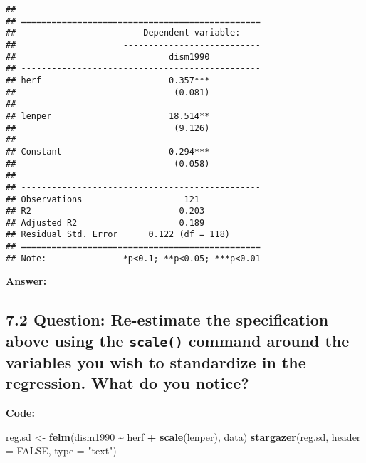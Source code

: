 \documentclass[
]{article}
\newenvironment{Shaded}{\begin{snugshade}}{\end{snugshade}}
\newcommand{\AttributeTok}[1]{\textcolor[rgb]{0.13,0.29,0.53}{#1}}
\newcommand{\ConstantTok}[1]{\textcolor[rgb]{0.56,0.35,0.01}{#1}}
\newcommand{\FunctionTok}[1]{\textcolor[rgb]{0.13,0.29,0.53}{\textbf{#1}}}
\newcommand{\NormalTok}[1]{#1}
\newcommand{\OtherTok}[1]{\textcolor[rgb]{0.56,0.35,0.01}{#1}}
\newcommand{\SpecialCharTok}[1]{\textcolor[rgb]{0.81,0.36,0.00}{\textbf{#1}}}
\newcommand{\StringTok}[1]{\textcolor[rgb]{0.31,0.60,0.02}{#1}}
\begin{document}
\begin{verbatim}
## 
## ===============================================
##                         Dependent variable:    
##                     ---------------------------
##                              dism1990          
## -----------------------------------------------
## herf                         0.357***          
##                               (0.081)          
##                                                
## lenper                       18.514**          
##                               (9.126)          
##                                                
## Constant                     0.294***          
##                               (0.058)          
##                                                
## -----------------------------------------------
## Observations                    121            
## R2                             0.203           
## Adjusted R2                    0.189           
## Residual Std. Error      0.122 (df = 118)      
## ===============================================
## Note:               *p<0.1; **p<0.05; ***p<0.01
\end{verbatim}

\textbf{Answer:}

\clearpage

\hypertarget{question-re-estimate-the-specification-above-using-the-scale-command-around-the-variables-you-wish-to-standardize-in-the-regression.-what-do-you-notice}{%
\subsection{\texorpdfstring{7.2 Question: Re-estimate the specification
above using the \texttt{scale()} command around the variables you wish
to standardize in the regression. What do you
notice?}{7.2 Question: Re-estimate the specification above using the scale() command around the variables you wish to standardize in the regression. What do you notice?}}\label{question-re-estimate-the-specification-above-using-the-scale-command-around-the-variables-you-wish-to-standardize-in-the-regression.-what-do-you-notice}}

\textbf{Code:}

\begin{Shaded}
\begin{Highlighting}[]
\NormalTok{reg.sd }\OtherTok{\textless{}{-}} \FunctionTok{felm}\NormalTok{(dism1990 }\SpecialCharTok{\textasciitilde{}}\NormalTok{ herf }\SpecialCharTok{+} \FunctionTok{scale}\NormalTok{(lenper), data)}
\FunctionTok{stargazer}\NormalTok{(reg.sd, }\AttributeTok{header =} \ConstantTok{FALSE}\NormalTok{, }\AttributeTok{type =} \StringTok{"text"}\NormalTok{)}
\end{Highlighting}
\end{Shaded}
\end{document}
